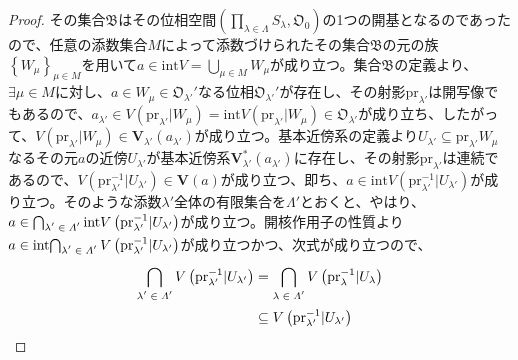 \documentclass[dvipdfmx]{jsarticle}
\begin{document}
\begin{proof}
その集合$\mathfrak{B}$はその位相空間$\left( \prod_{\lambda \in \varLambda} S_{\lambda},\mathfrak{O}_{0} \right)$の1つの開基となるのであったので、任意の添数集合$M$によって添数づけられたその集合$\mathfrak{B}$の元の族$\left\{ W_{\mu} \right\}_{\mu \in M}$を用いて$a \in {\mathrm{int}}V = \bigcup_{\mu \in M} W_{\mu}$が成り立つ。集合$\mathfrak{B}$の定義より、$\exists\mu \in M$に対し、$a \in W_{\mu} \in \mathfrak{O}_{\lambda'}'$なる位相$\mathfrak{O}_{\lambda'}'$が存在し、その射影${\mathrm{pr}}_{\lambda'}$は開写像でもあるので、$a_{\lambda'} \in V\left( {\mathrm{pr}}_{\lambda'}|W_{\mu} \right) = {\mathrm{int}}{V\left( {\mathrm{pr}}_{\lambda'}|W_{\mu} \right)} \in \mathfrak{O}_{\lambda'}$が成り立ち、したがって、$V\left( {\mathrm{pr}}_{\lambda'}|W_{\mu} \right) \in \mathbf{V}_{\lambda'}\left( a_{\lambda'} \right)$が成り立つ。基本近傍系の定義より$U_{\lambda'} \subseteq {\mathrm{pr}}_{\lambda'}W_{\mu}$なるその元$a$の近傍$U_{\lambda'}$が基本近傍系$\mathbf{V}_{\lambda'}^{*}\left( a_{\lambda'} \right)$に存在し、その射影${\mathrm{pr}}_{\lambda'}$は連続であるので、$V\left( {\mathrm{pr}}_{\lambda'}^{- 1}|U_{\lambda'} \right) \in \mathbf{V}(a)$が成り立つ、即ち、$a \in {\mathrm{int}}{V\left( {\mathrm{pr}}_{\lambda'}^{- 1}|U_{\lambda'} \right)}$が成り立つ。そのような添数$\lambda'$全体の有限集合を$\varLambda'$とおくと、やはり、$a \in \bigcap_{\scriptsize \begin{matrix}
\lambda' \in \varLambda' \\
\end{matrix}} {{\mathrm{int}}{V\left( {\mathrm{pr}}_{\lambda'}^{- 1}|U_{\lambda'} \right)}}$が成り立つ。開核作用子の性質より$a \in {\mathrm{int}}{\bigcap_{\scriptsize \begin{matrix}
\lambda' \in \varLambda' \\
\end{matrix}} {V\left( {\mathrm{pr}}_{\lambda'}^{- 1}|U_{\lambda'} \right)}}$が成り立つかつ、次式が成り立つので、
\begin{align*}
\bigcap_{\scriptsize \begin{matrix}
\lambda' \in \varLambda' \\
\end{matrix}} {V\left( {\mathrm{pr}}_{\lambda'}^{- 1}|U_{\lambda'} \right)} &= \bigcap_{\scriptsize \begin{matrix}
\lambda \in \varLambda' \\
\end{matrix}} {V\left( {\mathrm{pr}}_{\lambda}^{- 1}|U_{\lambda} \right)}\\
&\subseteq V\left( {\mathrm{pr}}_{\lambda'}^{- 1}|U_{\lambda'} \right)\\

\end{align*}
\end{proof}
\end{document}

